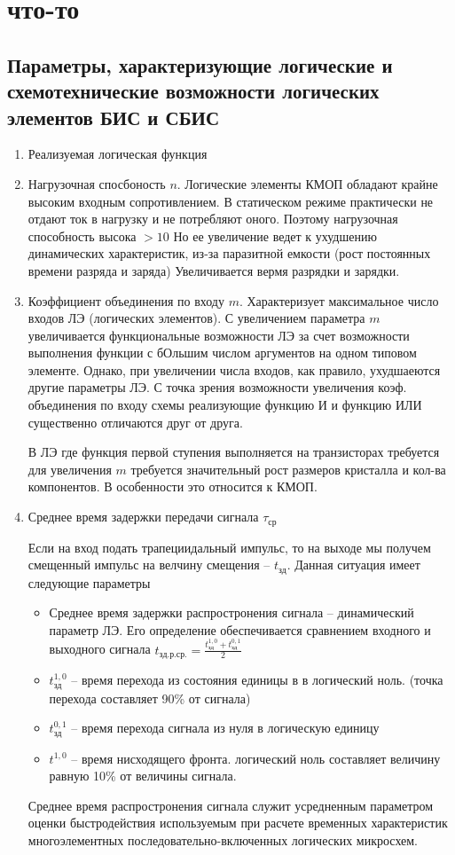 \documentclass{article}
\begin{document}
\section{что-то}
\subsection{Параметры, характеризующие логические и схемотехнические возможности логических элементов БИС и СБИС}
\begin{enumerate}
	\item Реализуемая логическая функция
	\item Нагрузочная спосбоность $n$.
Логические элементы КМОП обладают крайне высоким входным сопротивлением.
В статическом режиме практически не отдают ток в нагрузку и не потребляют оного.
Поэтому нагрузочная способность высока $> 10$
Но ее увеличение ведет к ухудшению динамических характеристик, из-за паразитной емкости (рост постоянных времени разряда и заряда)
Увеличивается вермя разрядки и зарядки.
	\item Коэффициент объединения по входу $m$. Характеризует максимальное число входов ЛЭ (логических элементов).
	С увеличением параметра $m$ увеличивается функциональные возможности ЛЭ за счет возможности выполнения функции с бОльшим числом аргументов
	на одном типовом элементе. Однако, при увеличении числа входов, как правило, ухудшаеются другие параметры ЛЭ.
	С точка зрения возможности увеличения коэф. объединения по входу схемы реализующие функцию И и функцию ИЛИ существенно отличаются друг от друга.
	
	В ЛЭ где функция первой ступения выполняется на транзисторах требуется для увеличения $m$ требуется значительный рост размеров кристалла и кол-ва
	компонентов. В особенности это относится к КМОП.
	\item Среднее время задержки передачи сигнала $\tau_{ср}$

	Если на вход подать трапециидальный импульс, то на выходе мы получем смещенный импульс на велчину смещения -- $t_{зд}$. Данная ситуация имеет следующие параметры
	\begin{itemize}
		\item Среднее время задержки распростронения сигнала -- динамический параметр ЛЭ. Его определение обеспечивается сравнением входного и выходного сигнала
		$t_{зд. р. ср.} = \frac{t_{зд}^{1,0} + t_{зд}^{0,1}}{2}$
		\item $t_{зд}^{1,0}$ -- время перехода из состояния единицы в в логический ноль. (точка перехода составляет 90\% от сигнала)
		\item $t_{зд}^{0,1}$ -- время перехода сигнала из нуля в логическую единицу
		\item $t^{1,0}$ -- время нисходящего фронта. логический ноль составляет величину равную 10\% от величины сигнала.
	\end{itemize}
	Среднее время распростронения сигнала служит усредненным параметром оценки быстродействия используемым при расчете временных характеристик многоэлементных
	последовательно-включенных логических микросхем.


\end{enumerate}
\end{document}
